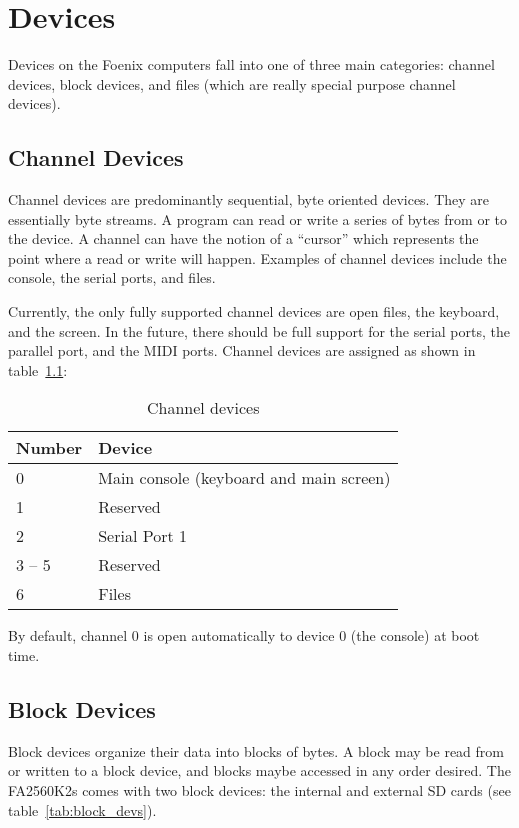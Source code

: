 \chapter{Devices}
Devices on the Foenix computers fall into one of three main categories: channel devices, block devices, and files (which are really special purpose channel devices).

\section{Channel Devices}
Channel devices are predominantly sequential, byte oriented devices. They are essentially byte streams. A program can read or write a series of bytes from or to the device. A channel can have the notion of a ``cursor'' which represents the point where a read or write will happen. Examples of channel devices include the console, the serial ports, and files.

Currently, the only fully supported channel devices are open files, the keyboard, and the screen. In the future, there should be full support for the serial ports, the parallel port, and the MIDI ports. Channel devices are assigned as shown in table~\ref{tab:chan_devs}:

\begin{table}
    \begin{center}
        \begin{tabular}{|l||l|} \hline
            Number & Device \\ \hline\hline
            0 & Main console (keyboard and main screen) \\ \hline
            1 & Reserved \\ \hline
            2 & Serial Port 1 \\ \hline
            3 -- 5 & Reserved \\ \hline
            6 & Files \\ \hline
        \end{tabular}
    \end{center}
    \caption{Channel devices}
    \label{tab:chan_devs}
\end{table}

By default, channel 0 is open automatically to device 0 (the console) at boot time.

\section{Block Devices}
Block devices organize their data into blocks of bytes. A block may be read from or written to a block device, and blocks maybe accessed in any order desired. The FA2560K2s comes with two block devices: the internal and external SD cards (see table~\ref{tab:block_devs}).

